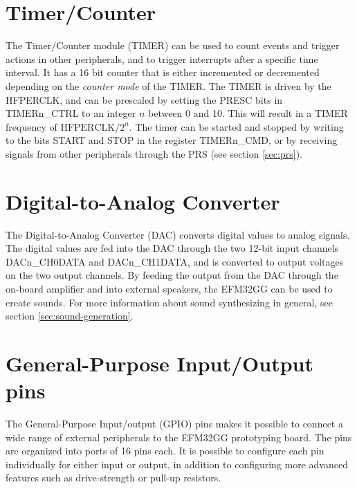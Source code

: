 \section{Timer/Counter}\label{sec:timer}
The Timer/Counter module (TIMER) can be used to count events and trigger actions in other peripherals, and to trigger interrupts after a specific time interval. It has a 16 bit counter that is either incremented or decremented depending on the \emph{counter mode} of the TIMER. The TIMER is driven by the HFPERCLK, and can be prescaled by setting the PRESC bits in TIMERn\_CTRL to an integer $n$ between 0 and 10. This will result in a TIMER frequency of $\text{HFPERCLK}/2^{n}$. The timer can be started and stopped by writing to the bits START and STOP in the register TIMERn\_CMD, or by receiving signals from other peripherals through the PRS (see section \ref{sec:prs}).

%


\section{Digital-to-Analog Converter}
The Digital-to-Analog Converter (DAC) converts digital values to analog signals. The digital values are fed into the DAC through the two 12-bit input channels DACn\_CH0DATA and DACn\_CH1DATA, and is converted to output voltages on the two output channels. By feeding the output from the DAC through the on-board amplifier and into external speakers, the EFM32GG can be used to create sounds. For more information about sound synthesizing in general, see section \ref{sec:sound-generation}.


\section{General-Purpose Input/Output pins}
The General-Purpose Input/output (GPIO) pins makes it possible to connect a wide range of external peripherals to the EFM32GG prototyping board. The pins are organized into ports of 16 pins each. It is possible to configure each pin individually for either input or output, in addition to configuring more advanced features such as drive-strength or pull-up resistors.



